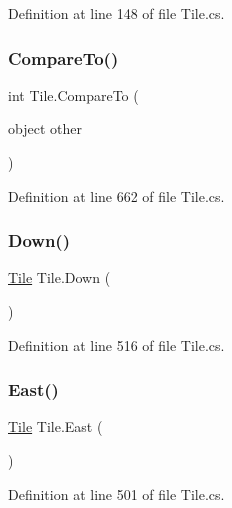 Definition at line 148 of file Tile.\+cs.

\mbox{\label{class_tile_a6151ab911bebe9e8c930427799697165}} 
\subsubsection{\texorpdfstring{Compare\+To()}{CompareTo()}}
{\footnotesize\ttfamily int Tile.\+Compare\+To (\begin{DoxyParamCaption}\item[{object}]{other }\end{DoxyParamCaption})}



Definition at line 662 of file Tile.\+cs.

\mbox{\label{class_tile_a339b45abc4deea7cfb2827bafae48df0}} 
\subsubsection{\texorpdfstring{Down()}{Down()}}
{\footnotesize\ttfamily \hyperlink{class_tile}{Tile} Tile.\+Down (\begin{DoxyParamCaption}{ }\end{DoxyParamCaption})}



Definition at line 516 of file Tile.\+cs.

\mbox{\label{class_tile_afb3865cdc4621002d32d863e6c3dee87}} 
\subsubsection{\texorpdfstring{East()}{East()}}
{\footnotesize\ttfamily \hyperlink{class_tile}{Tile} Tile.\+East (\begin{DoxyParamCaption}{ }\end{DoxyParamCaption})}



Definition at line 501 of file Tile.\+cs.

\mbox{\label{class_tile_acfb09ae7f8dc543b46f76cef3de2c689}} 
